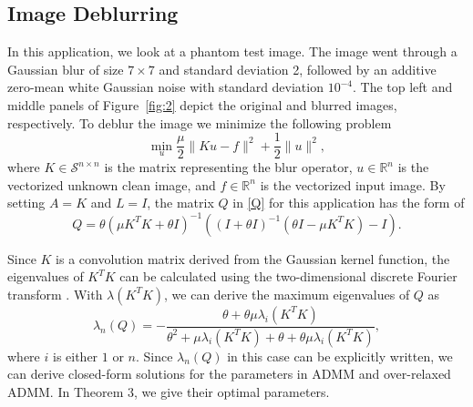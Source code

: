 \documentclass[letterpaper]{article} %
\begin{document}
\subsection{Image Deblurring}
In this application, we look at a phantom test image. The image went through a Gaussian blur of size $7\times7$ and standard deviation 2, followed by an additive zero-mean white Gaussian noise with standard deviation $10^{-4}$. The top left and middle panels of Figure~\ref{fig:2} depict the original and blurred images, respectively. To deblur the image we minimize the following problem
\begin{equation}\label{deblurring2}
	\min\limits_{u}\frac{\mu}{2}\|K u-f\|^2+\frac{1}{2}\|u\|^2,
\end{equation}
where $K \in \mathcal{S}^{n\times n}$ is the matrix representing the blur operator, $u\in \mathbb{R}^{n}$ is the vectorized unknown clean image, and $f\in \mathbb{R}^{n}$ is the vectorized input image.  By setting $A=K$ and $L=I$, the matrix $Q$ in \eqref{Q} for this application has the form of
\begin{equation*}%
	Q=\theta (\mu K^T K+\theta I)^{-1} (( I +\theta I)^{-1} (\theta I -  \mu K^T K )- I).
\end{equation*}

Since $K$ is a convolution matrix derived from the Gaussian kernel function, the eigenvalues of $K^T K$ can be calculated using the two-dimensional discrete Fourier transform \cite{capus2003fractional}. With $\lambda\left(K^T K\right)$, we can derive the maximum eigenvalues of $Q$ as
\begin{equation} \label{app1Q}
	\lambda_n(Q) =- \frac{\theta +\theta\mu \lambda_i(K^T K) }{\theta^2+\mu \lambda_i(K^T K) +\theta +\theta\mu \lambda_i(K^T K)},
\end{equation}
where $ i$ is either $1$ or $n$. Since $\lambda_n (Q)$ in this case can be explicitly written, we can derive closed-form solutions for the parameters in ADMM and over-relaxed ADMM. In Theorem 3, we give their optimal parameters.
\end{document}
